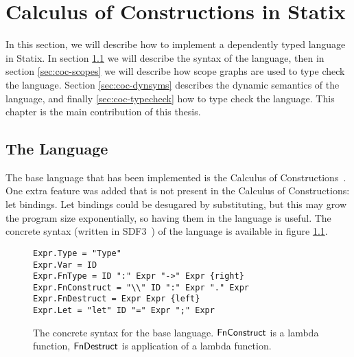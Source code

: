 \chapter{Calculus of Constructions in Statix}
\label{chap:baselang}

In this section, we will describe how to implement a dependently typed language in Statix. In section \ref{sec:coc-syntax} we will describe the syntax of the language, then in section \ref{sec:coc-scopes} we will describe how scope graphs are used to type check the language. Section \ref{sec:coc-dynsyms} describes the dynamic semantics of the language, and finally \ref{sec:coc-typecheck} how to type check the language. This chapter is the main contribution of this thesis.

\section{The Language}
\label{sec:coc-syntax}

The base language that has been implemented is the Calculus of Constructions~\cite{Coquand_Huet_1988}. One extra feature was added that is not present in the Calculus of Constructions: let bindings. Let bindings could be desugared by substituting, but this may grow the program size exponentially, so having them in the language is useful. The concrete syntax (written in SDF3~\cite{sdf3}) of the language is available in figure \ref{fig:syntax}.

\begin{figure}[h]
\lstset{language=SDF3}
\begin{lstlisting}
Expr.Type = "Type"
Expr.Var = ID
Expr.FnType = ID ":" Expr "->" Expr {right}
Expr.FnConstruct = "\\" ID ":" Expr "." Expr
Expr.FnDestruct = Expr Expr {left}
Expr.Let = "let" ID "=" Expr ";" Expr
\end{lstlisting}
\lstset{language=base}
\caption{The concrete syntax for the base language. $\mathsf{FnConstruct}$ is a lambda function, $\mathsf{FnDestruct}$ is application of a lambda function.}
\label{fig:syntax}
\end{figure}

